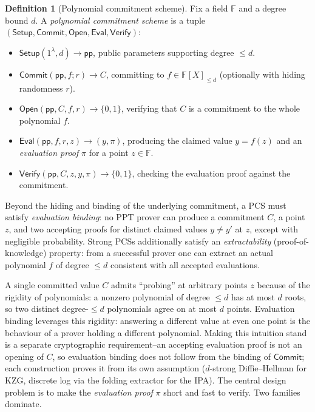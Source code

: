 \documentclass[11pt,a4paper]{article}
\theoremstyle{definition}
\newtheorem{definition}[theorem]{Definition}
\theoremstyle{remark}
\newcommand{\F}{\ensuremath{\mathbb{F}}}
\begin{document}
\begin{definition}[Polynomial commitment scheme]\label{commitments:def:pcs}
Fix a field \(\F\) and a degree bound \(d\). A \emph{polynomial commitment scheme} is a tuple \((\mathsf{Setup}, \mathsf{Commit}, \mathsf{Open}, \mathsf{Eval}, \mathsf{Verify})\):
\begin{itemize}
  \item \(\mathsf{Setup}(1^\lambda, d) \to \mathsf{pp}\), public parameters supporting degree \(\le d\).
  \item \(\mathsf{Commit}(\mathsf{pp}, f; r) \to C\), committing to \(f \in \F[X]_{\le d}\) (optionally with hiding randomness \(r\)).
  \item \(\mathsf{Open}(\mathsf{pp}, C, f, r) \to \{0,1\}\), verifying that \(C\) is a commitment to the whole polynomial \(f\).
  \item \(\mathsf{Eval}(\mathsf{pp}, f, r, z) \to (y, \pi)\), producing the claimed value \(y = f(z)\) and an \emph{evaluation proof} \(\pi\) for a point \(z \in \F\).
  \item \(\mathsf{Verify}(\mathsf{pp}, C, z, y, \pi) \to \{0,1\}\), checking the evaluation proof against the commitment.
\end{itemize}
Beyond the hiding and binding of the underlying commitment, a PCS must satisfy \emph{evaluation binding}: no PPT prover can produce a commitment \(C\), a point \(z\), and two accepting proofs for distinct claimed values \(y \neq y'\) at \(z\), except with negligible probability. Strong PCSs additionally satisfy an \emph{extractability} (proof-of-knowledge) property: from a successful prover one can extract an actual polynomial \(f\) of degree \(\le d\) consistent with all accepted evaluations.
\end{definition}

A single committed value \(C\) admits ``probing'' at arbitrary points \(z\) because of the rigidity of polynomials: a nonzero polynomial of degree \(\le d\) has at most \(d\) roots, so two distinct degree-\(\le d\) polynomials agree on at most \(d\) points. Evaluation binding leverages this rigidity: answering a different value at even one point is the behaviour of a prover holding a different polynomial. Making this intuition stand is a separate cryptographic requirement--an accepting evaluation proof is not an opening of \(C\), so evaluation binding does not follow from the binding of \(\mathsf{Commit}\); each construction proves it from its own assumption (\(d\)-strong Diffie--Hellman for KZG, discrete log via the folding extractor for the IPA). The central design problem is to make the \emph{evaluation proof} \(\pi\) short and fast to verify. Two families dominate.
\end{document}
